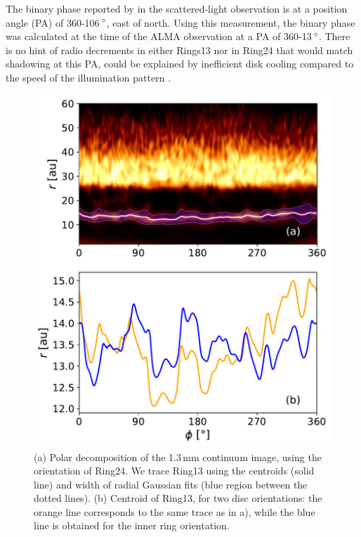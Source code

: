 \documentclass[letters,usenatbib,times]{mnras}
\begin{document}
The binary phase reported by \citet{dOrazi}  in the scattered-light observation is at a position angle (PA) of 360-106\,$\hbox{$^\circ$}$, east of north. Using this measurement, the binary phase was calculated at the time of the ALMA observation at a PA of 360-13\,$\hbox{$^\circ$}$. There is no hint of  radio decrements  in  either Rings13 nor  in Ring24 that would match shadowing at this PA,   could be explained by inefficient disk cooling compared to the speed of the illumination pattern \citep{Casassus2019MNRAS.486L..58C}.  

\begin{figure}
    \includegraphics[width=\columnwidth]{polar_ring_aprox_and_diff_inner.pdf}
    \caption{(a) Polar decomposition of the 1.3\,mm continuum image, using the orientation of Ring24. We trace Ring13 using the centroids (solid line) and width of radial Gaussian fits (blue region between the dotted lines). (b) Centroid of Ring13, for two disc orientations: the orange line corresponds to the same trace as in a), while the blue line is obtained for the inner ring orientation.}
    \label{fig:polarring}
\end{figure}
\end{document}
